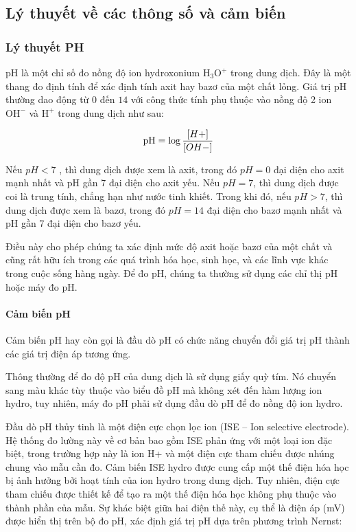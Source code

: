 \documentclass{article} %
\begin{document}
	
	\subsection{Lý thuyết về các thông số và cảm biến}
	\subsubsection{Lý thuyết PH}
	
	pH là một chỉ số đo nồng độ ion hydroxonium \( \text{H}_3\text{O}^+ \) trong dung dịch. Đây là một thang đo định tính để xác định tính axit hay bazơ của một chất lỏng. Giá trị pH thường dao động từ $0$ đến $14$ với công thức tính phụ thuộc vào nồng độ 2 ion \( \text{OH}^- \) và \( \text{H}^+ \) trong dung dịch như sau: 
	
	\begin{equation}
		\mathrm{pH}=\log \frac{[H+]}{[O H-]} \\    
	\end{equation}
	
	Nếu $pH < 7$ , thì dung dịch được xem là axit, trong đó $pH = 0$ đại diện cho axit mạnh nhất và pH gần 7 đại diện cho axit yếu. Nếu $pH = 7$, thì dung dịch được coi là trung tính, chẳng hạn như nước tinh khiết. Trong khi đó, nếu 
	$pH > 7$, thì dung dịch được xem là bazơ, trong đó $pH = 14$ đại diện cho bazơ mạnh nhất và pH gần 7 đại diện cho bazơ yếu.
	
    Điều này cho phép chúng ta xác định mức độ axit hoặc bazơ của một chất và cũng rất hữu ích trong các quá trình hóa học, sinh học, và các lĩnh vực khác trong cuộc sống hàng ngày. Để đo pH, chúng ta thường sử dụng các chỉ thị pH hoặc máy đo pH. 	
	
	\paragraph{Cảm biến pH}\mbox{}
	
	Cảm biến pH hay còn gọi là đầu dò pH có chức năng chuyển đổi giá trị pH thành các giá trị điện áp tương ứng.
	
	Thông thường để đo độ pH của dung dịch là sử dụng giấy quỳ tím. Nó chuyển sang màu khác tùy thuộc vào biểu đồ pH mà không xét đến hàm lượng ion hydro, tuy nhiên, máy đo pH phải sử dụng đầu dò pH để đo nồng độ ion hydro. 
	
	Đầu dò pH thủy tinh là một điện cực chọn lọc ion (ISE – Ion selective electrode). Hệ thống đo lường này về cơ bản bao gồm ISE phản ứng với một loại ion đặc biệt, trong trường hợp này là ion H+ và một điện cực tham chiếu được nhúng chung vào mẫu cần đo. Cảm biến ISE hydro được cung cấp một thế điện hóa học bị ảnh hưởng bởi hoạt tính của ion hydro trong dung dịch. Tuy nhiên, điện cực tham chiếu được thiết kế để tạo ra một thế điện hóa học không phụ thuộc vào thành phần của mẫu. Sự khác biệt giữa hai điện thế này, cụ thể là điện áp (mV) được hiển thị trên bộ đo pH, xác định giá trị pH dựa trên phương trình Nernst: 
	
\end{document}
